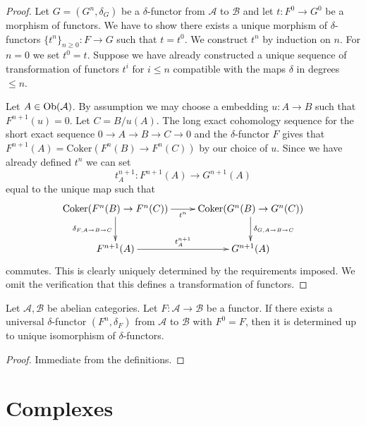 \begin{proof}
Let $G = (G^n, \delta_G)$ be a $\delta$-functor
from $\mathcal{A}$ to $\mathcal{B}$ and let $t : F^0 \to G^0$
be a morphism of functors. We have to show there exists
a unique morphism of $\delta$-functors $\{t^n\}_{n \geq 0} : F \to G$
such that $t = t^0$. We construct $t^n$ by induction on $n$.
For $n = 0$ we set $t^0 = t$.
Suppose we have already constructed a unique sequence of
transformation of functors $t^i$ for $i \leq n$ compatible with
the maps $\delta$ in degrees $\leq n$.

\medskip\noindent
Let $A \in \mathop{\rm Ob}\nolimits(\mathcal{A})$. By assumption we may choose
a embedding $u : A \to B$ such that $F^{n + 1}(u) = 0$.
Let $C = B/u(A)$. The long exact cohomology sequence for
the short exact sequence $0 \to A \to B \to C \to 0$ and the
$\delta$-functor $F$ gives that
$F^{n + 1}(A) = \text{Coker}(F^n(B) \to F^n(C))$ by our choice of $u$.
Since we have already defined $t^n$ we can set
$$
t^{n + 1}_A : F^{n + 1}(A) \to G^{n + 1}(A)
$$
equal to the unique map such that
$$
\xymatrix{
\text{Coker}(F^n(B) \to F^n(C)) \ar[r]_{t^n}
\ar[d]_{\delta_{F, A \to B \to C}} &
\text{Coker}(G^n(B) \to G^n(C))
\ar[d]^{\delta_{G, A \to B \to C}} \\
F^{n + 1}(A) \ar[r]^{t^{n + 1}_A} &
G^{n + 1}(A)
}
$$
commutes. This is clearly uniquely determined by the requirements
imposed. We omit the verification that this defines a transformation
of functors.
\end{proof}

\begin{lemma}
\label{lemma-uniqueness-universal-delta-functor}
Let $\mathcal{A}, \mathcal{B}$ be abelian categories.
Let $F : \mathcal{A} \to \mathcal{B}$ be a functor.
If there exists a universal $\delta$-functor
$(F^n, \delta_F)$ from $\mathcal{A}$ to $\mathcal{B}$
with $F^0 = F$, then it is determined up to unique isomorphism
of $\delta$-functors.
\end{lemma}

\begin{proof}
Immediate from the definitions.
\end{proof}







\section{Complexes}
\label{section-complexes}

